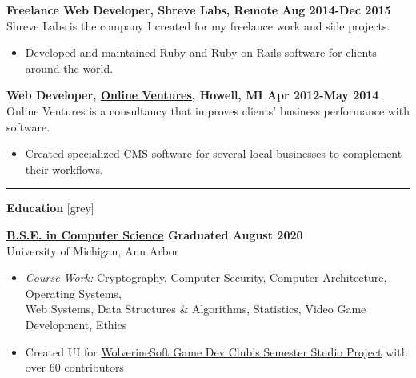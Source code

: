 \documentclass[10pt]{article}
\newcommand{\sectiontitle}[1]{
  {\color{grey}\rule[0.15cm]{0.5cm}{0.5pt}}
  {\Large\textbf{#1}}
  \xrfill[0.1cm]{0.5pt}[grey]
}
\newcommand{\itempad}{\vspace{0.1in}}
\begin{document}
  \textbf{Freelance Web Developer, Shreve Labs, Remote \hfill Aug 2014-Dec 2015}\\
  Shreve Labs is the company I created for my freelance work and side projects.
  \vspace{-0.07in}
  \begin{itemize}[leftmargin=1em]
    \setlength\itemsep{-0.3em}
    \item Developed and maintained Ruby and Ruby on Rails software for clients around the world.
  \end{itemize}
\itempad

  \textbf{Web Developer, \href{https://www.linkedin.com/company/online-ventures/}{Online Ventures}, Howell, MI \hfill Apr 2012-May 2014}\\
  Online Ventures is a consultancy that improves clients’ business performance with software.
  \vspace{-0.07in}
  \begin{itemize}[leftmargin=1em]
    \setlength\itemsep{-0.3em}
    \item Created specialized CMS software for several local businesses to complement their workflows.
  \end{itemize}
\itempad


  \sectiontitle{Education}
  \vspace{0.1in}

  \textbf{\href{https://ro.umich.edu/graduation/diplomas/degree-verification?dvid=C68OH1JS}{B.S.E. in Computer Science} \hfill  Graduated August 2020} \\
  University of Michigan, Ann Arbor
  \vspace{-0.07in}
  \begin{itemize}[leftmargin=1em]
    \setlength\itemsep{-0.3em}
    \item \textit{Course Work: } Cryptography, Computer Security, Computer Architecture, Operating Systems,\\
      Web Systems, Data Structures \& Algorithms, Statistics, Video Game Development, Ethics
    \item Created UI for \href{https://wolverinesoft-studio.itch.io/io}{WolverineSoft Game Dev Club's Semester Studio Project} with over 60 contributors
  \end{itemize}
\itempad
\end{document}
